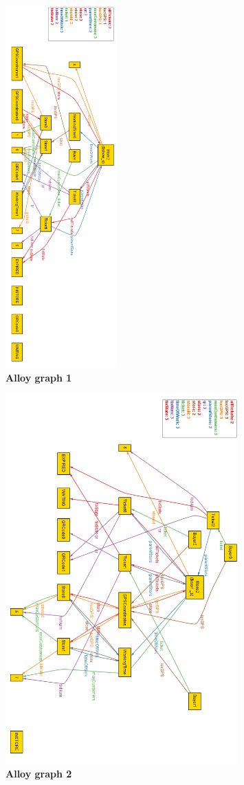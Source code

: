 \newpage

\begin{figure}[!htb]
\centering
\includegraphics[width=0.38\textwidth]{Images/AlloyGraph1V}
\caption{\label{fig:alloy1}\textbf{Alloy graph 1}}
\end{figure}

\newpage

\begin{figure}[!htb]
\centering
\includegraphics[width=0.8\textwidth]{Images/AlloyGraph2V}
\caption{\label{fig:alloy2}\textbf{Alloy graph 2}}
\end{figure}